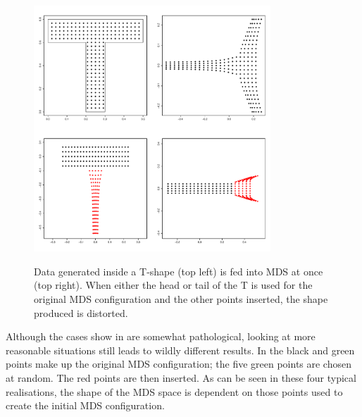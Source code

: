 \begin{figure}
\centering
\includegraphics[width=3.5in]{mds/figs/tshape.pdf} \\
\caption{Data generated inside a T-shape (top left) is fed into MDS at once (top right). When either the head or tail of the T is used for the original MDS configuration and the other points inserted, the shape produced is distorted.}
\label{tshape}
\end{figure}

Although the cases show in  are somewhat pathological, looking at more reasonable situations still leads to wildly different results. In  the black and green points make up the original MDS configuration; the five green points are chosen at random. The red points are then inserted. As can be seen in these four typical realisations, the shape of the MDS space is dependent on those points used to create the initial MDS configuration.

